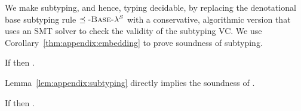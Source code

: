 %
We make subtyping, and hence, typing decidable,
by replacing the denotational base subtyping
rule $\preceq\textsc{-Base-\ensuremath{\lambda^{\mathit{S}}}}$ with a conservative,
algorithmic version that uses an SMT
solver to check the validity of the subtyping VC.
%
We use Corollary~\ref{thm:appendix:embedding} to prove
soundness of subtyping. 
%
\begin{lemma}\label{lem:appendix:subtyping} %
If {}
then {}.
\end{lemma}

%
%
Lemma~\ref{lem:appendix:subtyping} directly implies the soundness of \smtlan.
%
\begin{theorem}\label{thm:appendix:soundness-smt}
If  then .
\end{theorem}

